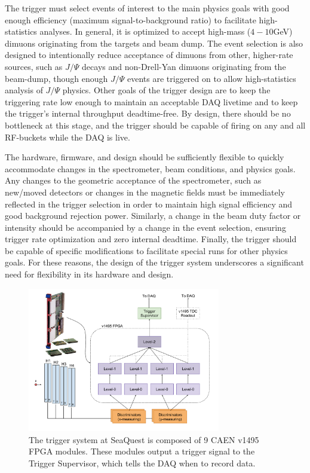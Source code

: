 The trigger must select events of interest to the main physics goals with good enough efficiency (maximum signal-to-background ratio) to facilitate high-statistics analyses. In general, it is optimized to accept high-mass ($4-10$GeV) dimuons originating from the targets and beam dump. The event selection is also designed to intentionally reduce acceptance of dimuons from other, higher-rate sources, such as $J/\Psi$ decays and non-Drell-Yan dimuons originating from the beam-dump, though enough $J/\Psi$ events are triggered on to allow high-statistics analysis of $J/\Psi$ physics. Other goals of the trigger design are to keep the triggering rate low enough to maintain an acceptable DAQ livetime and to keep the trigger's internal throughput deadtime-free. By design, there should be no bottleneck at this stage, and the trigger should be capable of firing on any and all RF-buckets while the DAQ is live.

The hardware, firmware, and design should be sufficiently flexible to quickly accommodate changes in the spectrometer, beam conditions, and physics goals. Any changes to the geometric acceptance of the spectrometer, such as new/moved detectors or changes in the magnetic fields must be immediately reflected in the trigger selection in order to maintain high signal efficiency and good background rejection power. Similarly, a change in the beam duty factor or intensity should be accompanied by a change in the event selection, ensuring trigger rate optimization and zero internal deadtime. Finally, the trigger should be capable of specific modifications to facilitate special runs for other physics goals. For these reasons, the design of the trigger system underscores a significant need for flexibility in its hardware and design.

\begin{figure}[t]
	\centering
	\includegraphics[width=0.75\textwidth]{figures/apparatus/v1495-trigger.pdf}
	\caption{The trigger system at SeaQuest is composed of 9 CAEN v1495 FPGA modules. These modules output a trigger signal to the Trigger Supervisor, which tells the DAQ when to record data.}
	\label{fig:1495-trigger}
\end{figure}

